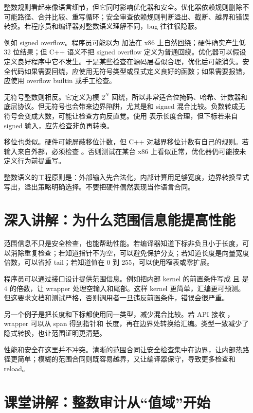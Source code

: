 整数规则看起来像语言细节，但它同时影响优化器和安全。优化器依赖规则删除不可能路径、合并比较、重写循环；安全审查依赖规则判断溢出、截断、越界和错误转换。若程序员和编译器对整数语义理解不同，bug 往往很隐蔽。

例如 signed overflow。程序员可能以为  加法在 x86 上自然回绕；硬件确实产生低 32 位结果；但 C++ 语义不把 signed overflow 定义为普通回绕。优化器可以假设定义良好程序中它不发生。于是某些检查在源码层看似合理，优化后可能消失。安全代码如果需要回绕，应使用无符号类型或显式定义良好的函数；如果需要报错，应使用 overflow builtin 或手工检查。

无符号整数则相反。它定义为模 \(2^N\) 回绕，所以非常适合位掩码、哈希、计数器和底层协议。但无符号也会带来边界陷阱，尤其是和 signed 混合比较。负数转成无符号会变成大数，可能让检查方向反直觉。使用  表示长度合理，但下标若来自 signed 输入，应先检查非负再转换。

移位也类似。硬件可能屏蔽移位计数，但 C++ 对越界移位计数有自己的规则。若输入来自外部，必须检查 。否则测试在某台 x86 上看似正常，优化器仍可能按未定义行为前提重写。

整数语义的工程原则是：外部输入先合法化，内部计算用足够宽度，边界转换显式写出，溢出策略明确选择。不要把硬件偶然表现当作语言合同。

\section{深入讲解：为什么范围信息能提高性能}

范围信息不只是安全检查，也能帮助性能。若编译器知道下标非负且小于长度，可以消除重复检查；若知道指针不为空，可以避免保护分支；若知道长度是向量宽度倍数，可以省掉 tail；若知道值在 0 到 255，可以使用窄表或零扩展。

程序员可以通过接口设计提供范围信息。例如把内部 kernel 的前置条件写成  且  是 4 的倍数，让 wrapper 处理空输入和尾部。这样 kernel 更简单，汇编更可预测。但这要求文档和测试严格，否则调用者一旦违反前置条件，错误会很严重。

另一个例子是把长度和下标都使用同一类型，减少混合比较。若 API 接收 ，wrapper 可以从 span 得到指针和  长度，再在边界处转换给汇编。类型一致减少了隐式转换，也让范围证明更清楚。

性能和安全在这里并不冲突。清晰的范围合同让安全检查集中在边界，让内部热路径更简单；模糊的范围合同则既容易越界，又让编译器保守，导致更多检查和 reload。

\section{课堂讲解：整数审计从“值域”开始}

